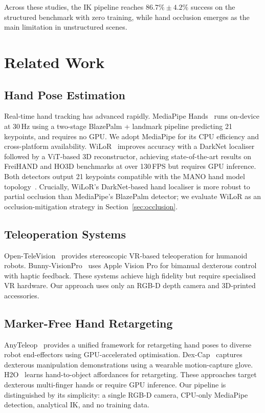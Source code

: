 \documentclass{ieeeaccess}
\begin{document}
Across these studies, the IK pipeline reaches $86.7\% \pm 4.2\%$
success on the structured benchmark with zero training, while hand
occlusion emerges as the main limitation in unstructured scenes.

\section{Related Work}
\label{sec:related}

\subsection{Hand Pose Estimation}
Real-time hand tracking has advanced rapidly. MediaPipe
Hands~\cite{zhang2020mediapipe} runs on-device at 30\,Hz using a
two-stage BlazePalm + landmark pipeline predicting 21 keypoints,
and requires no GPU. We adopt MediaPipe for its CPU efficiency and
cross-platform availability.
WiLoR~\cite{potamias2024wilor} improves accuracy with a DarkNet
localiser followed by a ViT-based 3D reconstructor, achieving
state-of-the-art results on FreiHAND and HO3D benchmarks at over
130\,FPS but requires GPU inference. Both detectors output 21 keypoints
compatible with the MANO hand model topology~\cite{romero2017mano}.
Crucially, WiLoR's DarkNet-based hand localiser is more robust to
partial occlusion than MediaPipe's BlazePalm detector; we evaluate
WiLoR as an occlusion-mitigation strategy in Section~\ref{sec:occlusion}.

\subsection{Teleoperation Systems}
Open-TeleVision~\cite{cheng2025opentv} provides stereoscopic VR-based
teleoperation for humanoid robots. Bunny-VisionPro~\cite{ding2024bunny}
uses Apple Vision Pro for bimanual dexterous control with haptic
feedback. These systems achieve high fidelity but require specialised
VR hardware. Our approach uses only an RGB-D depth camera and
3D-printed accessories.

\subsection{Marker-Free Hand Retargeting}
AnyTeleop~\cite{qin2023anyteleop} provides a unified framework for
retargeting hand poses to diverse robot end-effectors using
GPU-accelerated optimisation.
Dex-Cap~\cite{wang2024dexcap} captures dexterous manipulation
demonstrations using a wearable motion-capture glove.
H2O~\cite{wang2024h2o} learns hand-to-object affordances for
retargeting. These approaches target dexterous multi-finger
hands or require GPU inference. Our pipeline is distinguished by its
simplicity: a single RGB-D camera, CPU-only MediaPipe detection,
analytical IK, and no training data.
\end{document}
